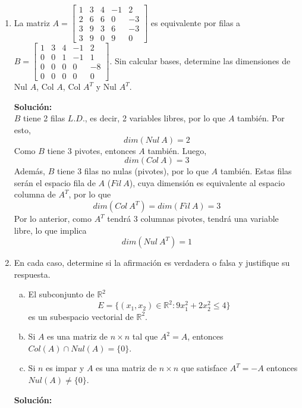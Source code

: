 \documentclass[12pt]{article}
\newenvironment{solucion}
{\begin{mdframed}[backgroundcolor=black!10]
		{\bf Solución:}\\
	}
	{
	\end{mdframed}
}
\newenvironment{preguntas}
{\begin{enumerate}\itemsep12pt
	}
	{
	\end{enumerate}
}
\newcommand{\R}{\mathbb{R}}
\begin{document}
\begin{preguntas}
\begin{solucion}
Multiplicación:

Sea $p \in W$ y $\alpha \in \R$,
P.D. $\alpha p \in W$.\\

Notemos que $p$ y $q$ serán de la forma
$$p(x) = a + bx + cx^2 + dx^3 \qquad y \qquad q(x) = e + fx + gx^2 + hx^3$$
Con
$$p(0) = a = 0, \qquad p(1) = a + b + c + d = 0$$
Luego,
$$(\alpha p)(x) = \alpha(a + bx + cx^2 + dx^3)$$
Además,
$$(\alpha p)(0) = \alpha a = \alpha \cdot 0 = 0$$
$$(\alpha p)(1) = \alpha (a + b + c + d) = \alpha \cdot 0 = 0$$

Por lo que $\alpha p \in W$ y $W$ es cerrado en la multiplicación\\

Entonces, tenemos que $W$ es un subespacio de $V$.
$$\blacksquare$$
\end{solucion}
\item La matriz $A = \begin{bmatrix}
	1 & 3 & 4 & -1 & 2\\
	2 & 6 & 6 & 0 & -3\\
	3 & 9 & 3 & 6 & -3\\
	3 & 9 & 0 & 9 & 0
	\end{bmatrix}$ es equivalente por filas a $B = \begin{bmatrix}
	1 & 3 & 4 & -1 & 2\\
	0 & 0 & 1 & -1 & 1\\
	0 & 0 & 0 & 0 & -8\\
	0 & 0 & 0 & 0 & 0
	\end{bmatrix}$. Sin calcular bases, determine las dimensiones de Nul $A$, Col $A$, Col $A^T$ y Nul $A^T$.
\begin{solucion}
$B$ tiene 2 filas $L.D.$, es decir, 2 variables libres, por lo que $A$ también. Por esto,
		$$dim(Nul\ A) = 2$$
		Como $B$ tiene 3 pivotes, entonces $A$ también. Luego,
		$$dim(Col\ A) = 3$$
		Además, $B$ tiene 3 filas no nulas (pivotes), por lo que $A$ también. Estas filas serán el espacio fila de $A$ ($Fil\ A$), cuya dimensión es equivalente al espacio columna de $A^T$, por lo que
		$$dim(Col\ A^T) = dim(Fil\ A) = 3$$
		Por lo anterior, como $A^T$ tendrá 3 columnas pivotes, tendrá una variable libre, lo que implica
		$$dim(Nul\ A^T) = 1$$
\end{solucion}
\item En cada caso, determine si la afirmación es verdadera o falsa y justifique su respuesta.
\begin{enumerate}[a)]
\item El subconjunto de $\R^2$
		$$E=\{(x_1, x_2) \in \R^2:9x_1^2+2x_2^2 \leq 4\}$$
		es un subespacio vectorial de $\R^2$.
\item Si $A$ es una matriz de $n \times n$ tal que $A^2=A$, entonces $Col(A) \cap Nul(A) = \{0\}$.
\item Si $n$ es impar y $A$ es una matriz de $n\times n$ que satisface $A^T = -A$ entonces $Nul(A) \neq \{0\}$.
\end{enumerate}
\begin{solucion}


\end{solucion}
\end{preguntas}
\end{document}
